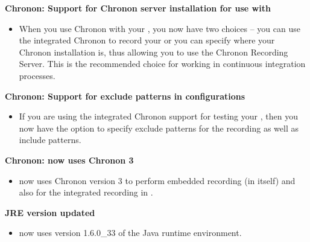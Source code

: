 \textbf{Chronon: Support for Chronon server installation for use with \gdauts{}}
\begin{itemize}
\item When you use Chronon with your \gdaut{}, you now have two choices -- you can use the integrated Chronon to record your \gdaut{} or you can specify where your Chronon installation is, thus allowing you to use the Chronon Recording Server. This is the recommended choice for working in continuous integration processes.   
\end{itemize}

\textbf{Chronon: Support for exclude patterns in \gdaut{} configurations}
\begin{itemize}
\item If you are using the integrated Chronon support for testing your \gdaut{}, then you now have the option to specify exclude patterns for the recording as well as include patterns. 
\end{itemize}

\textbf{Chronon: \app{} now uses Chronon 3}
\begin{itemize}
\item \app{} now uses Chronon version 3 to perform embedded recording (in \app{} itself) and also for the integrated recording in \gdauts{}.
\end{itemize}

\textbf{JRE version updated}
\begin{itemize}
\item \app{} now uses version 1.6.0\_33 of the Java runtime environment.
\end{itemize}


